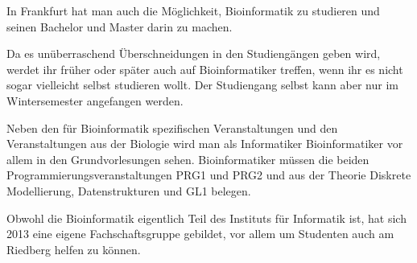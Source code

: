 In Frankfurt hat man auch die M\"oglichkeit, Bioinformatik zu studieren und seinen Bachelor und Master darin zu machen.

Da es un\"uberraschend \"Uberschneidungen in den Studieng\"angen geben wird, werdet ihr fr\"uher oder sp\"ater auch auf Bioinformatiker treffen, wenn ihr es nicht sogar vielleicht selbst studieren wollt.
Der Studiengang selbst kann aber nur im Wintersemester angefangen werden.

Neben den f\"ur Bioinformatik spezifischen Veranstaltungen und den Veranstaltungen aus der Biologie wird man 
als Informatiker Bioinformatiker vor allem in den Grundvorlesungen sehen.
Bioinformatiker m\"ussen die beiden Programmierungsveranstaltungen PRG1 und
PRG2 und aus der Theorie Diskrete Modellierung, Datenstrukturen und GL1 belegen.

Obwohl die Bioinformatik eigentlich Teil des Instituts f\"ur Informatik ist,
hat sich 2013 eine eigene Fachschaftsgruppe gebildet, vor allem um Studenten auch am
Riedberg helfen zu k\"onnen.

